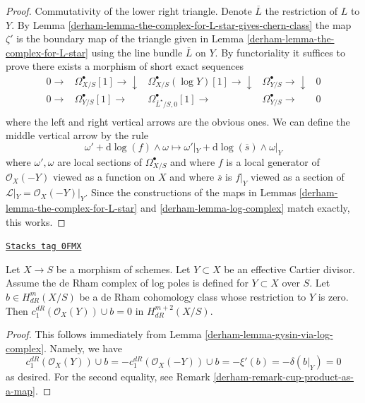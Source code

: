 \begin{proof}
\medskip\noindent
Commutativity of the lower right triangle. Denote
$\overline{L}$ the restriction of $L$ to $Y$.
By Lemma \ref{derham-lemma-the-complex-for-L-star-gives-chern-class}
the map $\zeta'$ is the boundary map of the triangle given in
Lemma \ref{derham-lemma-the-complex-for-L-star} using the line bundle
$\overline{L}$ on $Y$.
By functoriality it suffices to prove there exists a morphism of
short exact sequences
$$
\begin{array}{ccccc}0 \longrightarrow & \Omega^\bullet_{X/S}[1] \longrightarrow\downarrow & \Omega^\bullet_{X/S}(\log Y)[1] \longrightarrow\downarrow & \Omega^\bullet_{Y/S} \longrightarrow\downarrow & 0 \\ 0 \longrightarrow & \Omega^\bullet_{Y/S}[1] \longrightarrow & \Omega^\bullet_{\overline{L}^\star/S, 0}[1] \longrightarrow & \Omega^\bullet_{Y/S} \longrightarrow & 0 \\  &  &  &  & \end{array}
$$
where the left and right vertical arrows are the obvious ones.
We can define the middle vertical arrow by the rule
$$
\omega' + \text{d}\log(f) \wedge \omega \longmapsto
\omega'|_Y + \text{d}\log(\overline{s}) \wedge \omega|_Y
$$
where $\omega', \omega$ are local sections of $\Omega^\bullet_{X/S}$
and where $f$ is a local generator of $\mathcal{O}_X(-Y)$ viewed as
a function on $X$ and where $\overline{s}$ is $f|_Y$ viewed as a
section of $\mathcal{L}|_Y = \mathcal{O}_X(-Y)|_Y$.
Since the constructions of the maps in
Lemmas \ref{derham-lemma-the-complex-for-L-star} and \ref{derham-lemma-log-complex}
match exactly, this works.
\end{proof}

\begin{lemma}
\label{derham-lemma-log-complex-consequence}
\href{https://stacks.math.columbia.edu/tag/0FMX}{\texttt{Stacks tag 0FMX}}

Let $X \to S$ be a morphism of schemes. Let $Y \subset X$ be an effective
Cartier divisor. Assume the de Rham complex of log poles is defined for
$Y \subset X$ over $S$. Let $b \in H^m_{dR}(X/S)$ be a de Rham cohomology
class whose restriction to $Y$ is zero. Then
$c_1^{dR}(\mathcal{O}_X(Y)) \cup b = 0$ in $H^{m + 2}_{dR}(X/S)$.
\end{lemma}

\begin{proof}

This follows immediately from Lemma \ref{derham-lemma-gysin-via-log-complex}.
Namely, we have
$$
c_1^{dR}(\mathcal{O}_X(Y)) \cup b =
-c_1^{dR}(\mathcal{O}_X(-Y)) \cup b = -\xi'(b) = -\delta(b|_Y) = 0
$$
as desired. For the second equality, see
Remark \ref{derham-remark-cup-product-as-a-map}.
\end{proof}


